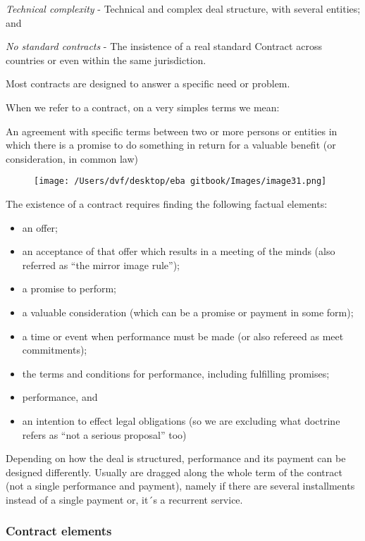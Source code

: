 \documentclass[]{book}
\theoremstyle{definition}
\theoremstyle{definition}
\theoremstyle{definition}
\theoremstyle{remark}
\begin{document}
\emph{Technical complexity} - Technical and complex deal structure, with
several entities; and

\emph{No standard contracts} - The insistence of a real standard
Contract across countries or even within the same jurisdiction.

Most contracts are designed to answer a specific need or problem.

When we refer to a contract, on a very simples terms we mean:

An agreement with specific terms between two or more persons or entities
in which there is a promise to do something in return for a valuable
benefit (or consideration, in common law)

\begin{figure}[htbp]
\centering
\texttt{[image: /Users/dvf/desktop/eba gitbook/Images/image31.png]}
\caption{}
\end{figure}

The existence of a contract requires finding the following factual
elements:

\begin{itemize}
\item
  an offer;
\item
  an acceptance of that offer which results in a meeting of the minds
  (also referred as ``the mirror image rule'');
\item
  a promise to perform;
\item
  a valuable consideration (which can be a promise or payment in some
  form);
\item
  a time or event when performance must be made (or also refereed as
  meet commitments);
\item
  the terms and conditions for performance, including fulfilling
  promises;
\item
  performance, and
\item
  an intention to effect legal obligations (so we are excluding what
  doctrine refers as ``not a serious proposal'' too)
\end{itemize}

Depending on how the deal is structured, performance and its payment can
be designed differently. Usually are dragged along the whole term of the
contract (not a single performance and payment), namely if there are
several installments instead of a single payment or, it´s a recurrent
service.

\subsubsection{Contract elements}\label{contract-elements}
\end{document}
